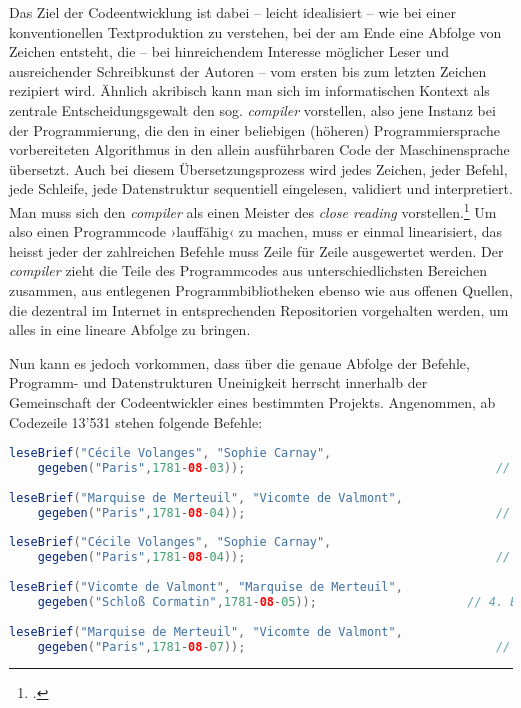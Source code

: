 \documentclass[a4paper,10pt]{article}
\newcommand{\inanf}[1]{›#1‹}
\begin{document}
Das Ziel der Codeentwicklung ist dabei – leicht idealisiert – wie bei einer konventionellen Textproduktion zu verstehen, bei der am Ende eine Abfolge von Zeichen entsteht, die – bei hinreichendem Interesse möglicher Leser und ausreichender Schreibkunst der Autoren – vom ersten bis zum letzten Zeichen rezipiert wird. Ähnlich akribisch kann man sich im informatischen Kontext als zentrale Entscheidungsgewalt den sog. \emph{compiler} vorstellen, also jene Instanz bei der Programmierung, die den in einer beliebigen (höheren) Programmiersprache vorbereiteten Algorithmus in den allein ausführbaren Code der Maschinensprache übersetzt. Auch bei diesem Übersetzungsprozess wird jedes Zeichen, jeder Befehl, jede Schleife, jede Datenstruktur sequentiell eingelesen, validiert und interpretiert. Man muss sich den \emph{compiler} als einen Meister des \emph{close reading} vorstellen.\footcite[\inanf{Close Reading} bezeichnet dabei nicht allein eine Lesetechnik im Poststrukturalismus, sondern bezieht sich ebenso auf die kodifizierende Funktion beim Programmieren, das Schliessen des Codes, das vom Compiler vorgenommen wird, vgl.][]{krajewski+vismann:2009} Um also einen Programmcode \inanf{lauffähig} zu machen, muss er einmal linearisiert, das heisst jeder der zahlreichen Befehle muss Zeile für Zeile ausgewertet werden. Der \emph{compiler} zieht die Teile des Programmcodes aus unterschiedlichsten Bereichen zusammen, aus entlegenen Programmbibliotheken ebenso wie aus offenen Quellen, die dezentral im Internet in entsprechenden Repositorien vorgehalten werden, um alles in eine lineare Abfolge zu bringen. 

Nun kann es jedoch vorkommen, dass über die genaue Abfolge der Befehle, Programm- und Datenstrukturen Uneinigkeit herrscht innerhalb der Gemeinschaft der Codeentwickler eines bestimmten Projekts. Angenommen, ab Codezeile 13'531 stehen folgende Befehle:
\begin{lstlisting}[language=Java, firstnumber=13531]
leseBrief("Cécile Volanges", "Sophie Carnay", 
	gegeben("Paris",1781-08-03));                           		// 1. Brief
	
leseBrief("Marquise de Merteuil", "Vicomte de Valmont", 
	gegeben("Paris",1781-08-04));                           		// 2. Brief
	
leseBrief("Cécile Volanges", "Sophie Carnay", 
	gegeben("Paris",1781-08-04));                           		// 3. Brief
	
leseBrief("Vicomte de Valmont", "Marquise de Merteuil", 
	gegeben("Schloß Cormatin",1781-08-05));                 	// 4. Brief
	
leseBrief("Marquise de Merteuil", "Vicomte de Valmont", 
	gegeben("Paris",1781-08-07));                           		// 5. Brief
\end{lstlisting}
\end{document}

